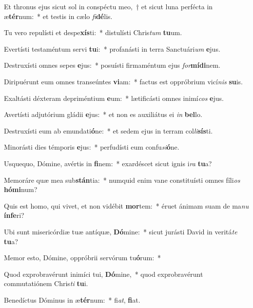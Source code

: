 \item Et thronus ejus sicut sol in conspéctu meo,~† et sicut luna perfécta in æ\textbf{tér}num:~* et testis in cælo \textit{fi}\textbf{dé}lis.
\item Tu vero repulísti et despe\textbf{xís}ti:~* distulísti Chris\textit{tum} \textbf{tu}um.
\item Evertísti testaméntum servi \textbf{tu}i:~* profanásti in terra Sanctuári\textit{um} \textbf{e}jus.
\item Destruxísti omnes sepes \textbf{e}jus:~* posuísti firmaméntum ejus \textit{for}\textbf{mí}\textbf{di}nem.
\item Diripuérunt eum omnes transeúntes \textbf{vi}am:~* factus est oppróbrium vicí\textit{nis} \textbf{su}is.
\item Exaltásti déxteram depriméntium \textbf{e}um:~* lætificásti omnes inimí\textit{cos} \textbf{e}jus.
\item Avertísti adjutórium gládii \textbf{e}jus:~* et non es auxiliátus ei \textit{in} \textbf{bel}lo.
\item Destruxísti eum ab emundati\textbf{ó}ne:~* et sedem ejus in terram col\textit{li}\textbf{sís}ti.
\item Minorásti dies témporis \textbf{e}jus:~* perfudísti eum confu\textit{si}\textbf{ó}ne.
\item Usquequo, Dómine, avértis in \textbf{fi}nem:~* exardéscet sicut ignis i\textit{ra} \textbf{tu}a?
\item Memoráre quæ mea sub\textbf{stán}tia:~* numquid enim vane constituísti omnes fíli\textit{os} \textbf{hó}\textbf{mi}num?
\item Quis est homo, qui vivet, et non vidébit \textbf{mor}tem:~* éruet ánimam suam de ma\textit{nu} \textbf{ín}\textbf{fe}ri?
\item Ubi sunt misericórdiæ tuæ antíquæ, \textbf{Dó}mine:~* sicut jurásti David in veritá\textit{te} \textbf{tu}a?
\item Memor esto, Dómine, oppróbrii servórum tu\textbf{ó}rum:~* 
\item Quod exprobravérunt inimíci tui, \textbf{Dó}mine,~* quod exprobravérunt commutatiónem Chris\textit{ti} \textbf{tu}i.
\item Benedíctus Dóminus in æ\textbf{tér}num:~* fi\textit{at}, \textbf{fi}at.
